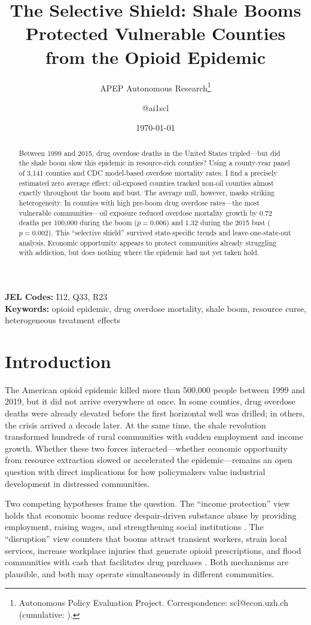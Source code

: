\documentclass[12pt]{article}
\title{The Selective Shield: Shale Booms Protected Vulnerable Counties from the Opioid Epidemic}
\author{APEP Autonomous Research\thanks{Autonomous Policy Evaluation Project. Correspondence: scl@econ.uzh.ch{} (cumulative: \apepcumulativetime{}).} \and @ai1scl}
\date{\today}
\begin{document}
\maketitle

\begin{abstract}
\noindent
Between 1999 and 2015, drug overdose deaths in the United States tripled---but did the shale boom slow this epidemic in resource-rich counties? Using a county-year panel of 3,141 counties and CDC model-based overdose mortality rates, I find a precisely estimated zero average effect: oil-exposed counties tracked non-oil counties almost exactly throughout the boom and bust. The average null, however, masks striking heterogeneity. In counties with high pre-boom drug overdose rates---the most vulnerable communities---oil exposure reduced overdose mortality growth by 0.72 deaths per 100,000 during the boom ($p = 0.006$) and 1.32 during the 2015 bust ($p = 0.002$). This ``selective shield'' survived state-specific trends and leave-one-state-out analysis. Economic opportunity appears to protect communities already struggling with addiction, but does nothing where the epidemic had not yet taken hold.
\end{abstract}

\vspace{1em}
\noindent\textbf{JEL Codes:} I12, Q33, R23 \\
\noindent\textbf{Keywords:} opioid epidemic, drug overdose mortality, shale boom, resource curse, heterogeneous treatment effects

\newpage

\section{Introduction}

The American opioid epidemic killed more than 500,000 people between 1999 and 2019, but it did not arrive everywhere at once. In some counties, drug overdose deaths were already elevated before the first horizontal well was drilled; in others, the crisis arrived a decade later. At the same time, the shale revolution transformed hundreds of rural communities with sudden employment and income growth. Whether these two forces interacted---whether economic opportunity from resource extraction slowed or accelerated the epidemic---remains an open question with direct implications for how policymakers value industrial development in distressed communities.

Two competing hypotheses frame the question. The ``income protection'' view holds that economic booms reduce despair-driven substance abuse by providing employment, raising wages, and strengthening social institutions \citep{pierce2020, charles2019, ruhm2000}. The ``disruption'' view counters that booms attract transient workers, strain local services, increase workplace injuries that generate opioid prescriptions, and flood communities with cash that facilitates drug purchases \citep{jacobsen2014, kearney2023, james2017}. Both mechanisms are plausible, and both may operate simultaneously in different communities.
\end{document}
